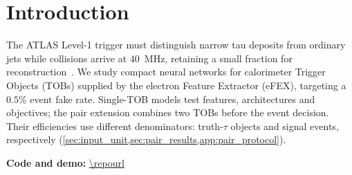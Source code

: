 \section{Introduction}
\label{sec:intro}
The ATLAS Level-1 trigger must distinguish narrow tau deposits from ordinary
jets while collisions arrive at \SI{40}{MHz}, retaining a small fraction for
reconstruction~\cite{atlas_trigger_run3,atlas_phase1_tdr}. We study compact
neural networks for calorimeter Trigger Objects (TOBs) supplied by the electron
Feature Extractor (eFEX), targeting a $0.5\%$ event fake rate. Single-TOB
models test features, architectures and objectives; the pair extension combines
two TOBs before the event decision. Their efficiencies use different denominators:
truth-$\tau$ objects and signal events, respectively
(\cref{sec:input_unit,sec:pair_results,app:pair_protocol}).

\noindent\textbf{Code and demo:} \url{\repourl}
